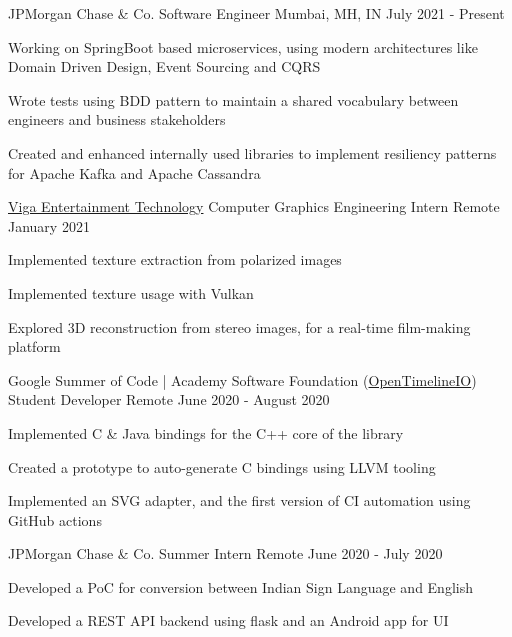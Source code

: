 \begin{cventries}
\cventry    
    {JPMorgan Chase \& Co.}
    {Software Engineer}
    {Mumbai, MH, IN}
    {July 2021 - Present}
    {
      \begin{cvitems}
      \item{Working on SpringBoot based microservices, using modern architectures like \\Domain Driven Design, Event Sourcing and CQRS}
      \item {Wrote tests using BDD pattern to maintain a shared vocabulary between engineers and business stakeholders}
      \item {Created and enhanced internally used libraries to implement resiliency patterns \\for Apache Kafka and Apache Cassandra}
      \end{cvitems} 
    }
\cventry    
	{\href{https://www.vigaet.com/}{Viga Entertainment Technology}}
	{Computer Graphics Engineering Intern}
	{Remote}
	{January 2021}
	{
		\begin{cvitems}
			\item{Implemented texture extraction from polarized images}
			\item{Implemented texture usage with Vulkan}
			\item {Explored 3D reconstruction from stereo images, for a real-time film-making platform}
		\end{cvitems} 
	}
\cventry    
	{Google Summer of Code | Academy Software Foundation (\href{https://github.com/AcademySoftwareFoundation/OpenTimelineIO}{OpenTimelineIO})}
	{Student Developer}
	{Remote}
	{June 2020 - August 2020}
	{
		\begin{cvitems}
			\item{Implemented C \& Java bindings for the C++ core of the library}
			\item{Created a prototype to auto-generate C bindings using LLVM tooling}
			\item {Implemented an SVG adapter, and the first version of CI automation using GitHub actions}
		\end{cvitems} 
	}
\cventry    
	{JPMorgan Chase \& Co.}
	{Summer Intern}
	{Remote}
	{June 2020 - July 2020}
	{
		\begin{cvitems}
			\item{Developed a PoC for conversion between Indian Sign Language and English}
			\item{Developed a REST API backend using flask and an Android app for UI}

\end{cvitems}}
\end{cventries}
